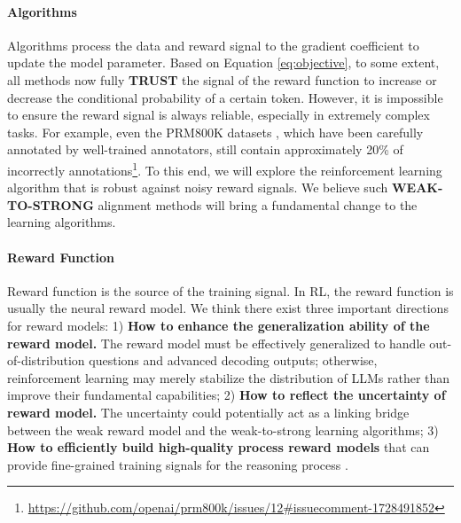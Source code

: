 \paragraph{Algorithms} Algorithms process the data and reward signal to the gradient coefficient to update the model parameter. 
Based on Equation \ref{eq:objective}, to some extent, all methods now fully \textbf{TRUST} the signal of the reward function to increase or decrease the conditional probability of a certain token.
However, it is impossible to ensure the reward signal is always reliable, especially in extremely complex tasks. For example, even the PRM800K datasets \citep{lightman2023let}, which have been carefully annotated by well-trained annotators, still contain approximately 20\% of incorrectly annotations\footnote{\url{https://github.com/openai/prm800k/issues/12\#issuecomment-1728491852}}. To this end, we will explore the reinforcement learning algorithm that is robust against noisy reward signals.  We believe such \textbf{WEAK-TO-STRONG} \citep{burns2023weak} alignment methods will bring a fundamental change to the learning algorithms.

\paragraph{Reward Function} Reward function is the source of the training signal.
In RL, the reward function is usually the neural reward model.
We think there exist three important directions for reward models:
1) \textbf{How to enhance the generalization ability of the reward model.} The reward model must be effectively generalized to handle out-of-distribution questions and advanced decoding outputs; otherwise, reinforcement learning may merely stabilize the distribution of LLMs rather than improve their fundamental capabilities;
2) \textbf{How to reflect the uncertainty of reward model.} The uncertainty could potentially act as a linking bridge between the weak reward model and the weak-to-strong learning algorithms;
3) \textbf{How to efficiently build high-quality process reward models} that can provide fine-grained training signals for the reasoning process \citep{lightman2023let,wang2023math}.




